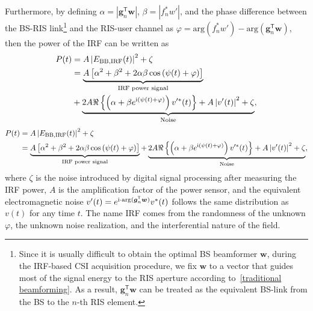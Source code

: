 \documentclass[journal,twocolumn]{IEEEtran}
\theoremstyle{nonumberplain}
\def \T {\bm \Theta}
\def \arg {\text{arg}}
\def \T {^{\mathsf{T}}}
\def \ri {{\rm i}}
\begin{document}
    Furthermore, by defining $\alpha = \left\vert\bm g_{n}\T\bm w\right\vert$, $\beta = \left\vert f_{n}^{*} w' \right\vert$, and the phase difference between the \ac{BS}-RIS link\footnote{Since it is usually difficult to obtain the optimal BS beamformer $\bm w$, during the IRF-based CSI acquisition procedure, we fix $\bm w$ to a vector that guides most of the signal energy to the RIS aperture according to~\eqref{traditional beamforming}. As a result, $\bm g_n\T \bm w$ can be treated as the equivalent BS-link from the BS to the $n$-th RIS element.} and the RIS-user channel as $\varphi = \arg\left(f_{n}^{*}w'\right)-\arg\left(\bm g_{n}\T\bm w\right)$, then the power of the \ac{IRF} can be written as
    \ifx\onecol\undefined
        \begin{equation}
            \label{eqn:power of interference}
            \begin{aligned}
                P(t)&=A \left| E_{{\rm BB, IRF}} (t)\right |^{2}+\zeta\\
                &=\underbrace{A\left[\alpha^{2}+\beta^{2}+2\alpha\beta\cos\left(\psi(t)+\varphi\right)\right]}_{\text{IRF power signal}}\\
                &+\underbrace{2A\Re\left\{\left(\alpha+\beta e^{\ri\left(\psi(t)+\varphi\right)}\right)v'^{*}(t)\right\}+A\left|v'(t)\right|^{2}+\zeta}_{\text{Noise}},\\
            \end{aligned}
        \end{equation}
    \else 
        \begin{equation}
            \label{eqn:power of interference}
            \begin{aligned}
                P(t)&=A \left| E_{{\rm BB, IRF}} (t)\right |^{2}+\zeta\\
                &=\underbrace{A\left[\alpha^{2}+\beta^{2}+2\alpha\beta\cos\left(\psi(t)+\varphi\right)\right]}_{\text{IRF power signal}}+\underbrace{2A\Re\left\{\left(\alpha+\beta e^{\ri\left(\psi(t)+\varphi\right)}\right)v'^{*}(t)\right\}+A\left|v'(t)\right|^{2}+\zeta}_{\text{Noise}},\\
            \end{aligned}
        \end{equation}
    \fi
    where $\zeta$ is the noise introduced by digital signal processing after measuring the IRF power, $A$ is the amplification factor of the power sensor, and the equivalent electromagnetic noise $v'(t) = e^{\ri\cdot{\rm arg}({\bm g}_n\T \bm w)}v^*(t)$ follows the same distribution as $v(t)$ for any time $t$.
    The name IRF comes from the randomness of the unknown $\varphi$, the unknown noise realization, and the interferential nature of the field.
\end{document}
